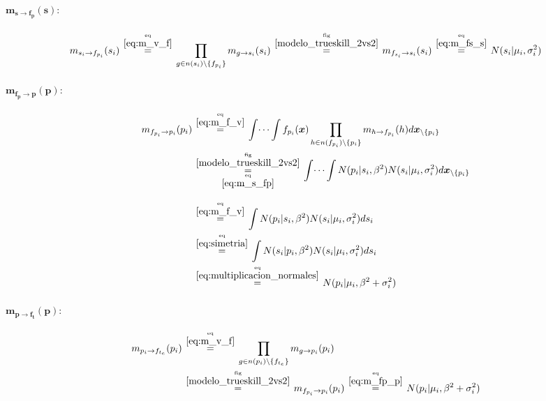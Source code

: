 \documentclass[article]{jss}
\newcommand\hfrac[2]{\genfrac{}{}{0pt}{}{#1}{#2}} %
\begin{document}
\begin{appendix}
\paragraph{$\bm{m_{s \rightarrow f_p}(s)}:$}

\begin{equation}\label{eq:m_s_fp}
 m_{s_i \rightarrow f_{p_i}}(s_i) \overset{\hfrac{\text{eq}}{\ref{eq:m_v_f}}}{=} \prod_{g \in n(s_i) \setminus  \{f_{p_i} \}} m_{g \rightarrow s_i} (s_i) \overset{\hfrac{\text{fig}}{\ref{modelo_trueskill_2vs2}}}{=} m_{f_{s_i} \rightarrow s_i}(s_i) \overset{\hfrac{\text{eq}}{\ref{eq:m_fs_s}}}{=}   N(s_i| \mu_i, \sigma_i^2)
\end{equation}



\paragraph{$\bm{m_{f_p \rightarrow p}(p)}:$}

\begin{equation}\label{eq:m_fp_p}
\begin{split}
 m_{f_{p_i} \rightarrow p_i}(p_i) & \overset{\hfrac{\text{eq}}{\ref{eq:m_f_v}}}{=} \int \dots \int f_{p_i}(\bm{x}) \prod_{h \in n(f_{p_i}) \setminus \{p_i\} } m_{h \rightarrow f_{p_i}}(h) d\bm{x}_{\setminus \{p_i\} }  \\
 & \overset{\hfrac{\text{fig}}{\ref{modelo_trueskill_2vs2}}}{\underset{\hfrac{\text{eq}}{\ref{eq:m_s_fp}}}{=}} \int \dots \int N(p_i| s_i, \beta^2) N(s_i| \mu_i, \sigma_i^2) d\bm{x}_{\setminus \{p_i\} } \\[0.3cm]
 & \overset{\hfrac{\text{eq}}{\ref{eq:m_f_v}}}{=} \int N(p_i| s_i, \beta^2) N(s_i| \mu_i, \sigma_i^2) ds_i \\
 & \overset{\hfrac{\text{eq}}{\ref{eq:simetria}}}{=} \int N(s_i|p_i, \beta^2) N(s_i| \mu_i, \sigma_i^2) ds_i \\ 
& \overset{\hfrac{\text{eq}}{\ref{eq:multiplicacion_normales}}}{=} N(p_i|\mu_i,\beta^2 + \sigma_i^2)
\end{split}
\end{equation}

\paragraph{$\bm{m_{p \rightarrow f_t}(p)}:$}

\begin{equation}\label{eq:m_p_ft}
\begin{split}
 m_{p_i \rightarrow f_{t_e}}(p_i) & \overset{\hfrac{\text{eq}}{\ref{eq:m_v_f}}}{=} \prod_{g \in n(p_i) \setminus  \{f_{t_e} \}} m_{g \rightarrow p_i} (p_i) \\ 
 & \overset{\hfrac{\text{fig}}{\ref{modelo_trueskill_2vs2}}}{=} m_{f_{p_i} \rightarrow p_i}(p_i) \overset{\hfrac{\text{eq}}{\ref{eq:m_fp_p}}}{=} N(p_i|\mu_i,\beta^2 + \sigma_i^2)
\end{split}
\end{equation}


\end{appendix}
\end{document}
